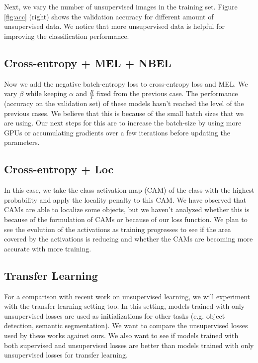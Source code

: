 \documentclass[runningheads]{llncs}
\begin{document}
Next, we vary the number of unsupervised images in the training set. Figure \ref{fig:acc} (right)
shows the validation accuracy for different amount of unsupervised data. We notice that more
unsupervised data is helpful for improving the classification performance. 

\subsection{Cross-entropy + MEL + NBEL}
Now we add the negative batch-entropy loss to cross-entropy loss and MEL. We vary $\beta$ while
keeping $\alpha$ and $\frac{R}{T}$ fixed from the previous case. The performance (accuracy on the
validation set) of these models hasn't reached the level of the previous cases. We
believe that this is because of the small batch sizes that we are using. Our next steps for this are
to increase the batch-size by using more GPUs or accumulating gradients over a few iterations before
updating the parameters.

\subsection{Cross-entropy + Loc}
In this case, we take the class activation map (CAM) of the class with the highest probability and
apply the locality penalty to this CAM. We have observed that CAMs
are able to localize some objects, but we haven't analyzed whether this is because of the
formulation of CAMs or because of our loss function. We plan to see the evolution of the
activations as training progresses to see if the area covered by the activations is reducing and
whether the CAMs are becoming more accurate with more training. 

\subsection{Transfer Learning}
For a comparison with recent work on unsupervised learning, we will experiment
with the transfer learning setting too. In this setting, models trained with only unsupervised
losses are used as initializations for other tasks (e.g. object detection, semantic segmentation).
We want to compare the unsupervised losses used by these works against ours. We also want to see if
models trained with both supervised and unsupervised losses are better than models trained with only
unsupervised losses for transfer learning. 



\end{document}
